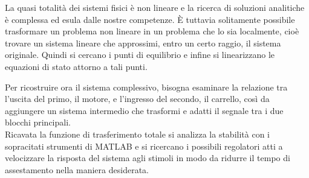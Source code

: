 La quasi totalità dei sistemi fisici è non lineare e la ricerca di soluzioni analitiche è complessa ed esula dalle nostre competenze. È tuttavia solitamente possibile trasformare un problema non lineare in un problema che lo sia localmente, cioè trovare un sistema lineare che approssimi, entro un certo raggio, il sistema originale.
Quindi si cercano i punti di equilibrio e infine si linearizzano le equazioni di stato attorno a tali punti.

Per ricostruire ora il sistema complessivo, bisogna esaminare la relazione tra l'uscita del primo, il motore, e l'ingresso del secondo, il carrello, così da aggiungere un sistema intermedio che trasformi e adatti il segnale tra i due blocchi principali.\\
Ricavata la funzione di trasferimento totale si analizza la stabilità con i sopracitati strumenti di MATLAB e si ricercano  i possibili regolatori atti a velocizzare la risposta del sistema agli stimoli in modo da ridurre il tempo di assestamento nella maniera desiderata.\\



